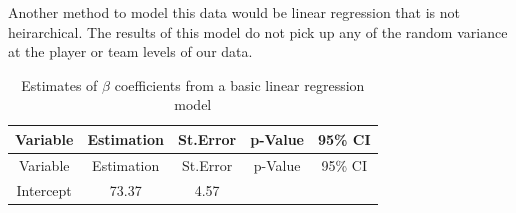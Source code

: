 \documentclass[12pt,twoside]{reedthesis}
\begin{document}
Another method to model this data would be linear regression that is not
heirarchical. The results of this model do not pick up any of the random
variance at the player or team levels of our data.
\begin{longtable}[]{@{}ccccc@{}}
\caption{\label{tab:tab3} Estimates of \(\beta\) coefficients from a basic
linear regression model}\tabularnewline
\toprule
\begin{minipage}[b]{0.25\columnwidth}\centering\strut
Variable\strut
\end{minipage} & \begin{minipage}[b]{0.15\columnwidth}\centering\strut
Estimation\strut
\end{minipage} & \begin{minipage}[b]{0.15\columnwidth}\centering\strut
St.Error\strut
\end{minipage} & \begin{minipage}[b]{0.15\columnwidth}\centering\strut
p-Value\strut
\end{minipage} & \begin{minipage}[b]{0.17\columnwidth}\centering\strut
95\% CI\strut
\end{minipage}\tabularnewline
\midrule
\endfirsthead
\toprule
\begin{minipage}[b]{0.25\columnwidth}\centering\strut
Variable\strut
\end{minipage} & \begin{minipage}[b]{0.15\columnwidth}\centering\strut
Estimation\strut
\end{minipage} & \begin{minipage}[b]{0.15\columnwidth}\centering\strut
St.Error\strut
\end{minipage} & \begin{minipage}[b]{0.15\columnwidth}\centering\strut
p-Value\strut
\end{minipage} & \begin{minipage}[b]{0.17\columnwidth}\centering\strut
95\% CI\strut
\end{minipage}\tabularnewline
\midrule
\endhead
\begin{minipage}[t]{0.25\columnwidth}\centering\strut
Intercept\strut
\end{minipage} & \begin{minipage}[t]{0.15\columnwidth}\centering\strut
73.37\strut
\end{minipage} & \begin{minipage}[t]{0.15\columnwidth}\centering\strut
4.57\strut
\end{minipage} & \begin{minipage}[t]{0.15\columnwidth}\centering\strut

\end{minipage}
\end{longtable}
\end{document}
